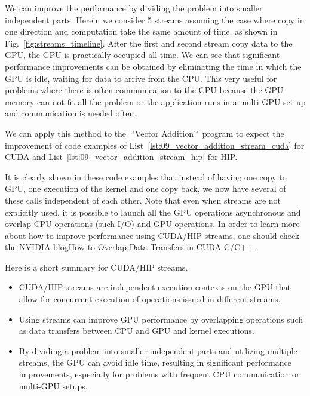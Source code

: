 \par
We can improve the performance by dividing the problem into smaller independent parts.
Herein we consider 5 streams assuming the case where copy in one direction and computation take the same amount of time, as shown in Fig.~\ref{fig:streams_timeline}.
After the first and second stream copy data to the GPU, the GPU is practically occupied all time.
We can see that significant performance improvements can be obtained by eliminating the time in which the GPU is idle, waiting for data to arrive from the CPU.
This very useful for problems where there is often communication to the CPU because the GPU memory can not fit all the problem or the application runs in a multi-GPU set up and communication is needed often.


\par
We can apply this method to the~\lq\lq Vector Addition\rq\rq~program to expect the improvement of code examples of List~\ref{lst:09_vector_addition_stream_cuda} for CUDA and List~\ref{lst:09_vector_addition_stream_hip} for HIP.







\par
It is clearly shown in these code examples that instead of having one copy to GPU, one execution of the kernel and one copy back, we now have several of these calls independent of each other.
Note that even when streams are not explicitly used, it is possible to launch all the GPU operations asynchronous and overlap CPU operations (such I/O) and GPU operations.
In order to learn more about how to improve performance using CUDA/HIP streams, one should check the NVIDIA blog\href{https://developer.nvidia.com/blog/how-overlap-data-transfers-cuda-cc/}{How to Overlap Data Transfers in CUDA C/C++}.


\par
Here is a short summary for CUDA/HIP streams.
\begin{itemize}
    \item CUDA/HIP streams are independent execution contexts on the GPU that allow for concurrent execution of operations issued in different streams.
    \item Using streams can improve GPU performance by overlapping operations such as data transfers between CPU and GPU and kernel executions.
    \item By dividing a problem into smaller independent parts and utilizing multiple streams, the GPU can avoid idle time, resulting in significant performance improvements, especially for problems with frequent CPU communication or multi-GPU setups.
\end{itemize}


